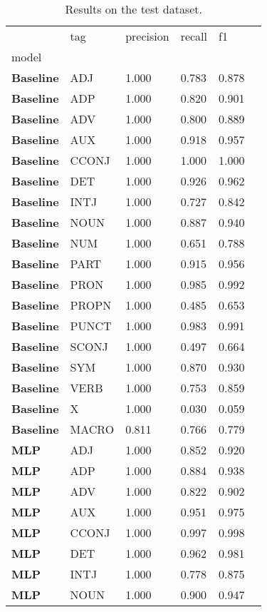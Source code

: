 \begin{table}
\caption{Results on the test dataset.}
\label{tab::ex_10_test}
\begin{tabular}{|l|l|l|l|l|l|}
\toprule
 & tag & precision & recall & f1 \\
model &  &  &  &  \\
\midrule
\textbf{Baseline} & ADJ & 1.000 & 0.783 & 0.878 \\
\textbf{Baseline} & ADP & 1.000 & 0.820 & 0.901 \\
\textbf{Baseline} & ADV & 1.000 & 0.800 & 0.889 \\
\textbf{Baseline} & AUX & 1.000 & 0.918 & 0.957 \\
\textbf{Baseline} & CCONJ & 1.000 & 1.000 & 1.000 \\
\textbf{Baseline} & DET & 1.000 & 0.926 & 0.962 \\
\textbf{Baseline} & INTJ & 1.000 & 0.727 & 0.842 \\
\textbf{Baseline} & NOUN & 1.000 & 0.887 & 0.940 \\
\textbf{Baseline} & NUM & 1.000 & 0.651 & 0.788 \\
\textbf{Baseline} & PART & 1.000 & 0.915 & 0.956 \\
\textbf{Baseline} & PRON & 1.000 & 0.985 & 0.992 \\
\textbf{Baseline} & PROPN & 1.000 & 0.485 & 0.653 \\
\textbf{Baseline} & PUNCT & 1.000 & 0.983 & 0.991 \\
\textbf{Baseline} & SCONJ & 1.000 & 0.497 & 0.664 \\
\textbf{Baseline} & SYM & 1.000 & 0.870 & 0.930 \\
\textbf{Baseline} & VERB & 1.000 & 0.753 & 0.859 \\
\textbf{Baseline} & X & 1.000 & 0.030 & 0.059 \\
\textbf{Baseline} & MACRO & 0.811 & 0.766 & 0.779 \\
\textbf{MLP} & ADJ & 1.000 & 0.852 & 0.920 \\
\textbf{MLP} & ADP & 1.000 & 0.884 & 0.938 \\
\textbf{MLP} & ADV & 1.000 & 0.822 & 0.902 \\
\textbf{MLP} & AUX & 1.000 & 0.951 & 0.975 \\
\textbf{MLP} & CCONJ & 1.000 & 0.997 & 0.998 \\
\textbf{MLP} & DET & 1.000 & 0.962 & 0.981 \\
\textbf{MLP} & INTJ & 1.000 & 0.778 & 0.875 \\
\textbf{MLP} & NOUN & 1.000 & 0.900 & 0.947 \\

\end{tabular}
\end{table}
